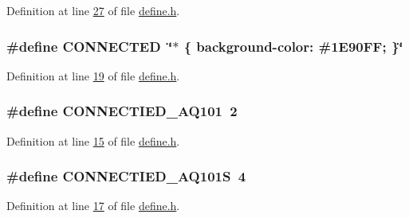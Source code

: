 Definition at line \hyperlink{a00090_source_l00027}{27} of file \hyperlink{a00090_source}{define.\+h}.

\hypertarget{a00090_af6202935c026af12978d46a765dafb90}{
\subsubsection[{C\+O\+N\+N\+E\+C\+T\+E\+D}]{\setlength{\rightskip}{0pt plus 5cm}\#define C\+O\+N\+N\+E\+C\+T\+E\+D~\char`\"{}$\ast$ \{ background-\/color\+: \#1\+E90\+F\+F; \}\char`\"{}}}\label{a00090_af6202935c026af12978d46a765dafb90}


Definition at line \hyperlink{a00090_source_l00019}{19} of file \hyperlink{a00090_source}{define.\+h}.

\hypertarget{a00090_ad3f30e8f0d6d166c560d596099924b1e}{
\subsubsection[{C\+O\+N\+N\+E\+C\+T\+I\+E\+D\+\_\+\+A\+Q101}]{\setlength{\rightskip}{0pt plus 5cm}\#define C\+O\+N\+N\+E\+C\+T\+I\+E\+D\+\_\+\+A\+Q101~2}}\label{a00090_ad3f30e8f0d6d166c560d596099924b1e}


Definition at line \hyperlink{a00090_source_l00015}{15} of file \hyperlink{a00090_source}{define.\+h}.

\hypertarget{a00090_ae5b15774e72547513ead1cbc9735b68d}{
\subsubsection[{C\+O\+N\+N\+E\+C\+T\+I\+E\+D\+\_\+\+A\+Q101\+S}]{\setlength{\rightskip}{0pt plus 5cm}\#define C\+O\+N\+N\+E\+C\+T\+I\+E\+D\+\_\+\+A\+Q101\+S~4}}\label{a00090_ae5b15774e72547513ead1cbc9735b68d}


Definition at line \hyperlink{a00090_source_l00017}{17} of file \hyperlink{a00090_source}{define.\+h}.

